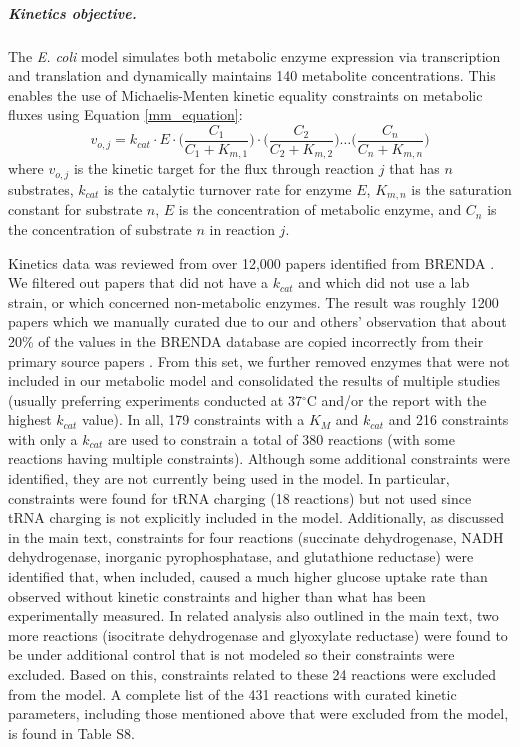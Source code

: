 \documentclass[12pt]{article}
\begin{document}
\subparagraph{Kinetics objective.}
The \emph{E. coli} model simulates both metabolic enzyme expression via transcription and translation and dynamically maintains 140 metabolite concentrations. This enables the use of Michaelis-Menten kinetic equality constraints on metabolic fluxes using Equation \ref{mm_equation}:
\begin{equation}
\label{mm_equation}
v_{o,j} = k_{cat} \cdot E \cdot \bigg ( \frac{C_1}{C_1 + K_{m,1}} \bigg ) \cdot \bigg ( \frac{C_2}{C_2 + K_{m,2}} \bigg ) \hdots \bigg ( \frac{C_n}{C_n + K_{m,n}} \bigg )
\end{equation}
where $v_{o,j}$ is the kinetic target for the flux through reaction $j$ that has $n$ substrates, $k_{cat}$ is the catalytic turnover rate for enzyme $E$, $K_{m,n}$ is the saturation constant for substrate $n$, $E$ is the concentration of metabolic enzyme, and $C_n$ is the concentration of substrate $n$ in reaction $j$.

Kinetics data was reviewed from over 12,000 papers identified from BRENDA \cite{Schomburg:2013gp}.  We filtered out papers that did not have a $k_{cat}$ and which did not use a lab strain, or which concerned non-metabolic enzymes.  The result was roughly 1200 papers which we manually curated due to our and others' observation that about 20\% of the values in the BRENDA database are copied incorrectly from their primary source papers \cite{Bar2011}.  From this set, we further removed enzymes that were not included in our metabolic model and consolidated the results of multiple studies (usually preferring experiments conducted at 37\(^\circ\)C and/or the report with the highest $k_{cat}$ value).  In all, 179 constraints with a $K_M$ and $k_{cat}$ and 216 constraints with only a $k_{cat}$ are used to constrain a total of 380 reactions (with some reactions having multiple constraints).  Although some additional constraints were identified, they are not currently being used in the model.  In particular, constraints were found for tRNA charging (18 reactions) but not used since tRNA charging is not explicitly included in the model.  Additionally, as discussed in the main text, constraints for four reactions (succinate dehydrogenase, NADH dehydrogenase, inorganic pyrophosphatase, and glutathione reductase) were identified that, when included, caused a much higher glucose uptake rate than observed without kinetic constraints and higher than what has been experimentally measured. In related analysis also outlined in the main text, two more reactions (isocitrate dehydrogenase and glyoxylate reductase) were found to be under additional control that is not modeled so their constraints were excluded.  Based on this, constraints related to these 24 reactions were excluded from the model. A complete list of the 431 reactions with curated kinetic parameters, including those mentioned above that were excluded from the model, is found in Table S8.
\end{document}
